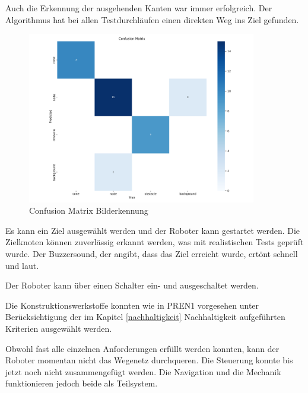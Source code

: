 Auch die Erkennung der ausgehenden Kanten war immer erfolgreich. Der Algorithmus hat bei allen Testdurchläufen einen direkten Weg ins Ziel gefunden. 

\begin{figure}[H]
\centering
\includegraphics[width=10cm]{assets/IT/yolo/confusion_matrix.png}
\caption{Confusion Matrix Bilderkennung}
\label{fig:conf-matrix-model}
\end{figure}

Es kann ein Ziel ausgewählt werden und der Roboter kann gestartet werden. Die Zielknoten können zuverlässig erkannt werden, was mit realistischen Tests geprüft wurde. Der Buzzersound, der angibt, dass das Ziel erreicht wurde, ertönt schnell und laut.

Der Roboter kann über einen Schalter ein- und ausgeschaltet werden.

Die Konstruktionswerkstoffe konnten wie in PREN1 vorgesehen unter Berücksichtigung der im Kapitel \ref{nachhaltigkeit} Nachhaltigkeit aufgeführten Kriterien ausgewählt werden.

Obwohl fast alle einzelnen Anforderungen erfüllt werden konnten, kann der Roboter momentan nicht das Wegenetz durchqueren. Die Steuerung konnte bis jetzt noch nicht zusammengefügt werden. Die Navigation und die Mechanik funktionieren jedoch beide als Teilsystem.